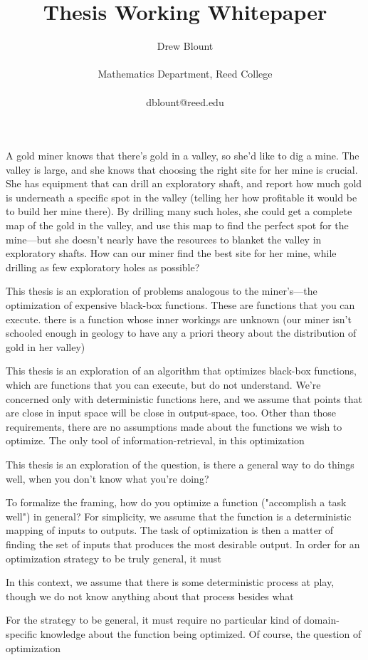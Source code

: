 \documentclass[letterpaper]{article}
\title{Thesis Working Whitepaper}
\author{Drew Blount \\
\mbox{}\\
Mathematics Department, Reed College\\
\\
dblount@reed.edu}
\begin{document}
\maketitle

A gold miner knows that there's gold in a valley, so she'd like to dig a mine. The valley is large, and she knows that choosing the right site for her mine is crucial. She has equipment that can drill an exploratory shaft, and report how much gold is underneath a specific spot in the valley (telling her how profitable it would be to build her mine there). By drilling many such holes, she could get a complete map of the gold in the valley, and use this map to find the perfect spot for the mine---but she doesn't nearly have the resources to blanket the valley in exploratory shafts. How can our miner find the best site for her mine, while drilling as few exploratory holes as possible?

This thesis is an exploration of problems analogous to the miner's---the optimization of expensive black-box functions. These are functions that you can execute. there is a function whose inner workings are unknown (our miner isn't schooled enough in geology to have any a priori theory about the distribution of gold in her valley)

This thesis is an exploration of an algorithm that optimizes black-box functions, which are functions that you can execute, but do not understand. We're concerned only with deterministic functions here, and we assume that points that are close in input space will be close in output-space, too. Other than those requirements, there are no assumptions made about the functions we wish to optimize. The only tool of information-retrieval, in this optimization 


This thesis is an exploration of the question, is there a general way to do things well, when you don't know what you're doing?

To formalize the framing, how do you optimize a function ("accomplish a task well") in general? For simplicity, we assume that the function is a deterministic mapping of inputs to outputs. The task of optimization is then a matter of finding the set of inputs that produces the most desirable output. In order for an optimization strategy to be truly general, it must

In this context, we assume that there is some deterministic process at play, though we do not know anything about that process besides what 

For the strategy to be general, it must require no particular kind of domain-specific knowledge about the function being optimized. Of course, the question of optimization
\end{document}
